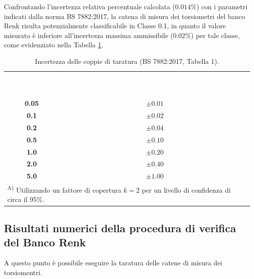 \documentclass[a4paper, twoside]{article}
\begin{document}
Confrontando l'incertezza relativa percentuale calcolata ($0.014\%$) con i parametri indicati dalla norma BS 7882:2017, la catena di misura dei torsiometri del banco Renk risulta potenzialmente classificabile in Classe 0.1, in quanto il valore misurato è inferiore all'incertezza massima ammissibile ($0.02\%$) per tale classe, come evidenziato nella Tabella \ref{tab:incertezza_coppie_taratura}.
\begin{table}[H]
    \centering
    \renewcommand{\arraystretch}{1.3}
    \begin{tabular}{|c|c|}
        \hline
        \rowcolor{headerblue}
        \textcolor{white}{\textbf{Classe di}} & \textcolor{white}{\textbf{Incertezza massima ammissibile della}} \\
        \rowcolor{headerblue}
        \textcolor{white}{\textbf{taratura}} & \textcolor{white}{\textbf{coppia di taratura applicata\textsuperscript{A)} [\%]}} \\
        \hline
        \rowcolor{rowlight}
        \textbf{0.05} & $\pm 0.01$ \\
        \hline
        \textbf{0.1} & $\pm 0.02$ \\
        \hline
        \rowcolor{rowlight}
        \textbf{0.2} & $\pm 0.04$ \\
        \hline
        \textbf{0.5} & $\pm 0.10$ \\
        \hline
        \rowcolor{rowlight}
        \textbf{1.0} & $\pm 0.20$ \\
        \hline
        \textbf{2.0} & $\pm 0.40$ \\
        \hline
        \rowcolor{rowlight}
        \textbf{5.0} & $\pm 1.00$ \\
        \hline
        \multicolumn{2}{|l|}{\small \textsuperscript{A)} Utilizzando un fattore di copertura $k = 2$ per un livello di confidenza di circa il 95\%.} \\
        \hline
    \end{tabular}
    \caption{Incertezza delle coppie di taratura (BS 7882:2017, Tabella 1).}
    \label{tab:incertezza_coppie_taratura}
\end{table}


\subsection{Risultati numerici della procedura di verifica del Banco Renk}


A questo punto è possibile eseguire la taratura delle catene di misura dei torsiomentri. 
\end{document}
